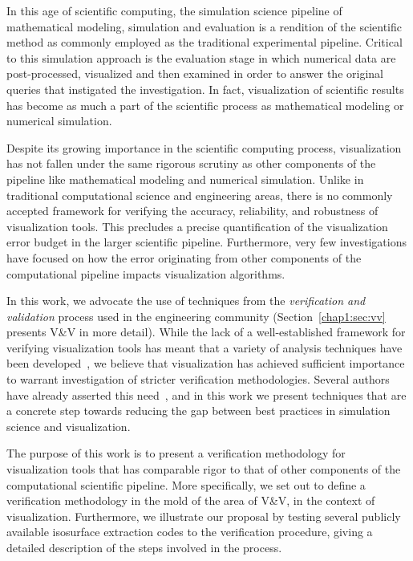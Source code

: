
In this age of scientific computing, 
the simulation science pipeline of mathematical
modeling, simulation and evaluation is
a rendition of the scientific method as commonly employed as
the traditional experimental pipeline.
Critical to this simulation approach is
the evaluation stage in which numerical
data are post-processed, visualized and 
then examined in order to answer the original
queries that instigated the investigation.
In fact, visualization of scientific results has become
as much a part of the scientific process as 
mathematical modeling or numerical simulation.  

Despite its growing importance in the
scientific computing process, visualization has not fallen under the same
rigorous scrutiny as other components of the pipeline
like mathematical modeling and numerical simulation.
Unlike in traditional computational science and engineering areas,
there is no commonly accepted framework for verifying the accuracy, reliability, 
and robustness of visualization tools. This precludes
a precise quantification of the visualization error budget in the 
larger scientific pipeline.
Furthermore, very few investigations have focused on how the error originating from 
other components of the computational pipeline
impacts visualization algorithms. %

In this work, we advocate the use of techniques from the
\emph{verification and validation} process used in the engineering
community (Section~\ref{chap1:sec:vv} presents V\&V in more detail). While
the lack of a well-established framework for verifying visualization
tools has meant that a variety of analysis techniques have been
developed~\cite{zhou01,tory04}, we believe that visualization 
has achieved sufficient importance to warrant investigation of
stricter verification methodologies. Several authors have
already asserted this need~\cite{globus95,kirby-vv-08}, and in this work we
present techniques that are a concrete step towards reducing the
gap between best practices in simulation science and visualization.


The purpose of this work is to present a verification methodology
for visualization tools that has comparable rigor to that of other 
components of the computational scientific pipeline. More specifically, we set out
to define a verification methodology in the mold of the area of V\&V, 
in the context of visualization.
Furthermore, we illustrate our proposal by testing several publicly 
available isosurface extraction
codes to the verification procedure, giving a detailed 
description of the steps involved in the process.


